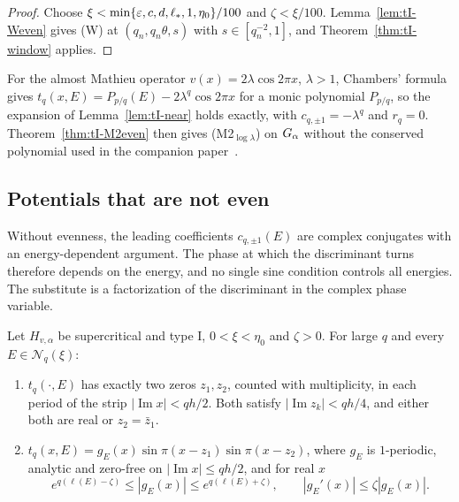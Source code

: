 \begin{proof}
Choose $\xi<\min\{\varepsilon,c,d,\ell_*,1,\eta_0\}/100$ and $\zeta<\xi/100$. Lemma~\ref{lem:tI-Weven} gives (W) at $(q_n,q_n\theta,s)$ with $s\in[q_n^{-2},1]$, and Theorem~\ref{thm:tI-window} applies.
\end{proof}

For the almost Mathieu operator $v(x)=2\lambda\cos2\pi x$, $\lambda>1$, Chambers' formula~\cite{Chambers1965} gives $t_q(x,E)=P_{p/q}(E)-2\lambda^q\cos2\pi x$ for a monic polynomial $P_{p/q}$, so the expansion of Lemma~\ref{lem:tI-near} holds exactly, with $c_{q,\pm1}=-\lambda^q$ and $r_q=0$. Theorem~\ref{thm:tI-M2even} then gives (M2$_{\log\lambda}$) on $G_\alpha$ without the conserved polynomial used in the companion paper~\cite{DMamo}.

\subsection{Potentials that are not even}\label{sec:tI-noneven}

Without evenness, the leading coefficients $c_{q,\pm1}(E)$ are complex conjugates with an energy-dependent argument. The phase at which the discriminant turns therefore depends on the energy, and no single sine condition controls all energies. The substitute is a factorization of the discriminant in the complex phase variable.

\begin{lemma}\label{lem:tI-H2}
Let $H_{v,\alpha}$ be supercritical and type I, $0<\xi<\eta_0$ and $\zeta>0$. For large $q$ and every $E\in\mathcal N_q(\xi)$:
\begin{enumerate}
\item $t_q(\cdot,E)$ has exactly two zeros $z_1,z_2$, counted with multiplicity, in each period of the strip $|\operatorname{Im}x|<qh/2$. Both satisfy $|\operatorname{Im}z_k|<qh/4$, and either both are real or $z_2=\bar z_1$.
\item $t_q(x,E)=g_E(x)\sin\pi(x-z_1)\sin\pi(x-z_2)$, where $g_E$ is $1$-periodic, analytic and zero-free on $|\operatorname{Im}x|\le qh/2$, and for real $x$
\[
e^{q(\ell(E)-\zeta)}\le|g_E(x)|\le e^{q(\ell(E)+\zeta)},\qquad|g_E'(x)|\le\zeta|g_E(x)|.
\]
\end{enumerate}
\end{lemma}

